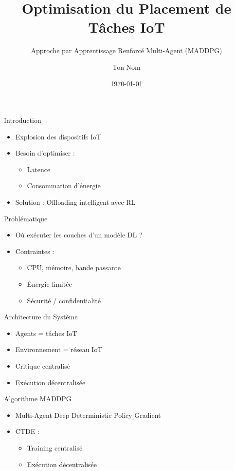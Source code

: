 \documentclass{beamer}
\title{Optimisation du Placement de Tâches IoT}
\subtitle{Approche par Apprentissage Renforcé Multi-Agent (MADDPG)}
\author{Ton Nom}
\date{\today}
\begin{document}
\frame{\titlepage}

\begin{frame}{Introduction}
\begin{itemize}
    \item Explosion des dispositifs IoT
    \item Besoin d’optimiser :
    \begin{itemize}
        \item Latence
        \item Consommation d’énergie
    \end{itemize}
    \item Solution : Offloading intelligent avec RL
\end{itemize}
\end{frame}

\begin{frame}{Problématique}
\begin{itemize}
    \item Où exécuter les couches d’un modèle DL ?
    \item Contraintes :
    \begin{itemize}
        \item CPU, mémoire, bande passante
        \item Énergie limitée
        \item Sécurité / confidentialité
    \end{itemize}
\end{itemize}
\end{frame}

\begin{frame}{Architecture du Système}
\begin{itemize}
    \item Agents = tâches IoT
    \item Environnement = réseau IoT
    \item Critique centralisé
    \item Exécution décentralisée
\end{itemize}
\end{frame}

\begin{frame}{Algorithme MADDPG}
\begin{itemize}
    \item Multi-Agent Deep Deterministic Policy Gradient
    \item CTDE :
    \begin{itemize}
        \item Training centralisé
        \item Exécution décentralisée
    \end{itemize}
\end{itemize}
\end{frame}
\end{document}

